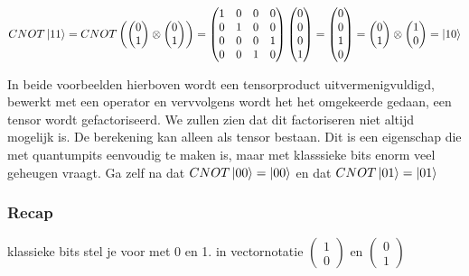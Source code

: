 \documentclass[../../main.tex]{subfiles}
\begin{document}
$
CNOT\ket{11}=CNOT
\begin{pmatrix}
\begin{pmatrix}
0\\
1
\end{pmatrix}
\otimes
\begin{pmatrix}
0\\
1
\end{pmatrix}
\end{pmatrix}
=
\begin{pmatrix}
1&0&0&0\\
0&1&0&0\\
0&0&0&1\\
0&0&1&0\\
\end{pmatrix}
\begin{pmatrix}
0\\
0\\
0\\
1
\end{pmatrix}
=
\begin{pmatrix}
0\\
0\\
1\\
0
\end{pmatrix}
=
\begin{pmatrix}
0\\
1
\end{pmatrix}
\otimes
\begin{pmatrix}
1\\
0
\end{pmatrix}
=
\ket{10}
$

In beide voorbeelden hierboven wordt een tensorproduct uitvermenigvuldigd, bewerkt met een operator en vervvolgens wordt het het omgekeerde gedaan, een tensor wordt gefactoriseerd. 
We zullen zien dat dit factoriseren niet altijd mogelijk is. De berekening kan alleen als tensor bestaan. Dit is een eigenschap die met quantumpits eenvoudig te maken is, maar met klasssieke bits enorm veel geheugen vraagt.
\easy Ga zelf na dat $CNOT\ket{00} = \ket{00}$ en dat $CNOT\ket{01} = \ket{01}$

\subsubsection*{Recap}
klassieke bits stel je voor met 0 en 1. in vectornotatie 
$\begin{pmatrix}
1\\
0
\end{pmatrix}$ en $
\begin{pmatrix}
0\\
1
\end{pmatrix}$
\end{document}
